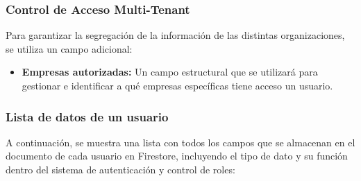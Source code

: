 \subsubsection{Control de Acceso Multi-Tenant}
Para garantizar la segregación de la información de las distintas organizaciones, se utiliza un campo adicional: \begin{itemize} \item \textbf{Empresas autorizadas:} Un campo estructural que se utilizará para gestionar e identificar a qué empresas específicas tiene acceso un usuario. \end{itemize}

\subsubsection{Lista de datos de un usuario}
A continuación, se muestra una lista con todos los campos que se almacenan en el documento de cada usuario en Firestore, incluyendo el tipo de dato y su función dentro del sistema de autenticación y control de roles:
